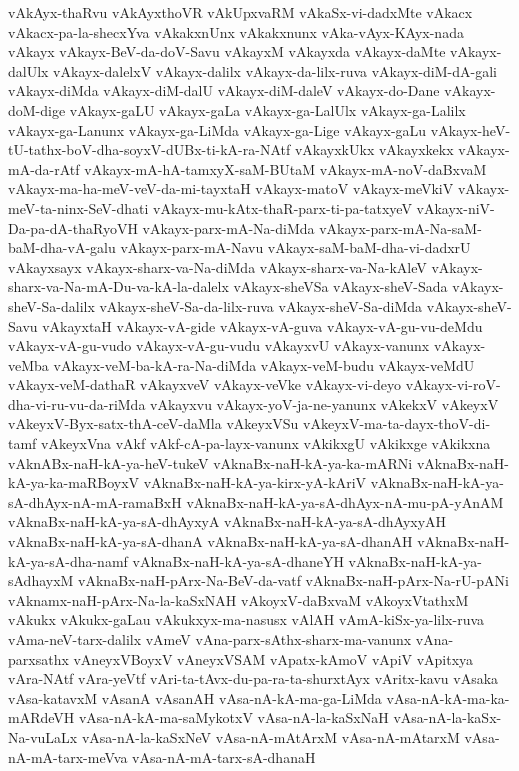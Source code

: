{vAkAyx-thaRvu
vAkAyxthoVR
vAkUpxvaRM
vAkaSx-vi-dadxMte
vAkacx
vAkacx-pa-la-shecxYva
vAkakxnUnx
vAkakxnunx
vAka-vAyx-KAyx-nada
vAkayx
vAkayx-BeV-da-doV-Savu
vAkayxM
vAkayxda
vAkayx-daMte
vAkayx-dalUlx
vAkayx-dalelxV
vAkayx-dalilx
vAkayx-da-lilx-ruva
vAkayx-diM-dA-gali
vAkayx-diMda
vAkayx-diM-dalU
vAkayx-diM-daleV
vAkayx-do-Dane
vAkayx-doM-dige
vAkayx-gaLU
vAkayx-gaLa
vAkayx-ga-LalUlx
vAkayx-ga-Lalilx
vAkayx-ga-Lanunx
vAkayx-ga-LiMda
vAkayx-ga-Lige
vAkayx-gaLu
vAkayx-heV-tU-tathx-boV-dha-soyxV-dUBx-ti-kA-ra-NAtf
vAkayxkUkx
vAkayxkekx
vAkayx-mA-da-rAtf
vAkayx-mA-hA-tamxyX-saM-BUtaM
vAkayx-mA-noV-daBxvaM
vAkayx-ma-ha-meV-veV-da-mi-tayxtaH
vAkayx-matoV
vAkayx-meVkiV
vAkayx-meV-ta-ninx-SeV-dhati
vAkayx-mu-kAtx-thaR-parx-ti-pa-tatxyeV
vAkayx-niV-Da-pa-dA-thaRyoVH
vAkayx-parx-mA-Na-diMda
vAkayx-parx-mA-Na-saM-baM-dha-vA-galu
vAkayx-parx-mA-Navu
vAkayx-saM-baM-dha-vi-dadxrU
vAkayxsayx
vAkayx-sharx-va-Na-diMda
vAkayx-sharx-va-Na-kAleV
vAkayx-sharx-va-Na-mA-Du-va-kA-la-dalelx
vAkayx-sheVSa
vAkayx-sheV-Sada
vAkayx-sheV-Sa-dalilx
vAkayx-sheV-Sa-da-lilx-ruva
vAkayx-sheV-Sa-diMda
vAkayx-sheV-Savu
vAkayxtaH
vAkayx-vA-gide
vAkayx-vA-guva
vAkayx-vA-gu-vu-deMdu
vAkayx-vA-gu-vudo
vAkayx-vA-gu-vudu
vAkayxvU
vAkayx-vanunx
vAkayx-veMba
vAkayx-veM-ba-kA-ra-Na-diMda
vAkayx-veM-budu
vAkayx-veMdU
vAkayx-veM-dathaR
vAkayxveV
vAkayx-veVke
vAkayx-vi-deyo
vAkayx-vi-roV-dha-vi-ru-vu-da-riMda
vAkayxvu
vAkayx-yoV-ja-ne-yanunx
vAkekxV
vAkeyxV
vAkeyxV-Byx-satx-thA-ceV-daMla
vAkeyxVSu
vAkeyxV-ma-ta-dayx-thoV-di-tamf
vAkeyxVna
vAkf
vAkf-cA-pa-layx-vanunx
vAkikxgU
vAkikxge
vAkikxna
vAknABx-naH-kA-ya-heV-tukeV
vAknaBx-naH-kA-ya-ka-mARNi
vAknaBx-naH-kA-ya-ka-maRBoyxV
vAknaBx-naH-kA-ya-kirx-yA-kAriV
vAknaBx-naH-kA-ya-sA-dhAyx-nA-mA-ramaBxH
vAknaBx-naH-kA-ya-sA-dhAyx-nA-mu-pA-yAnAM
vAknaBx-naH-kA-ya-sA-dhAyxyA
vAknaBx-naH-kA-ya-sA-dhAyxyAH
vAknaBx-naH-kA-ya-sA-dhanA
vAknaBx-naH-kA-ya-sA-dhanAH
vAknaBx-naH-kA-ya-sA-dha-namf
vAknaBx-naH-kA-ya-sA-dhaneYH
vAknaBx-naH-kA-ya-sAdhayxM
vAknaBx-naH-pArx-Na-BeV-da-vatf
vAknaBx-naH-pArx-Na-rU-pANi
vAknamx-naH-pArx-Na-la-kaSxNAH
vAkoyxV-daBxvaM
vAkoyxVtathxM
vAkukx
vAkukx-gaLau
vAkukxyx-ma-nasusx
vAlAH
vAmA-kiSx-ya-lilx-ruva
vAma-neV-tarx-dalilx
vAmeV
vAna-parx-sAthx-sharx-ma-vanunx
vAna-parxsathx
vAneyxVBoyxV
vAneyxVSAM
vApatx-kAmoV
vApiV
vApitxya
vAra-NAtf
vAra-yeVtf
vAri-ta-tAvx-du-pa-ra-ta-shurxtAyx
vAritx-kavu
vAsaka
vAsa-katavxM
vAsanA
vAsanAH
vAsa-nA-kA-ma-ga-LiMda
vAsa-nA-kA-ma-ka-mARdeVH
vAsa-nA-kA-ma-saMykotxV
vAsa-nA-la-kaSxNaH
vAsa-nA-la-kaSx-Na-vuLaLx
vAsa-nA-la-kaSxNeV
vAsa-nA-mAtArxM
vAsa-nA-mAtarxM
vAsa-nA-mA-tarx-meVva
vAsa-nA-mA-tarx-sA-dhanaH
}

